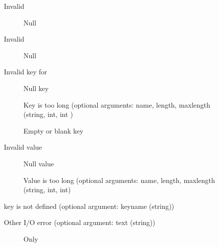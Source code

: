 \begin{description}
\item[ ]Invalid 
    \begin{description}
    \item[ ]Null
    \end{description}
\item[ ]Invalid 
    \begin{description}
    \item[ ]Null
    \end{description}
\item[ ]Invalid key for
    \begin{description}
    \item[ ]Null key
    \item[ ]Key
    is too long (optional 
      arguments: name, length, maxlength (string, int, int )
    \item[
    ]Empty or blank key 
    \end{description}
\item[ ]Invalid
     value 
    \begin{description}
    \item[ ]Null value
    \item[
    ]Value is too long (optional 
      arguments: name, length, maxlength (string, int, int)
    \end{description}
\item[
    ] key is not defined 
  (optional argument: keyname (string))
\item[ ]Other I/O error (optional
  argument: text (string)) 
    \begin{description}
    \item[ ]Only

\end{description}
\end{description}
